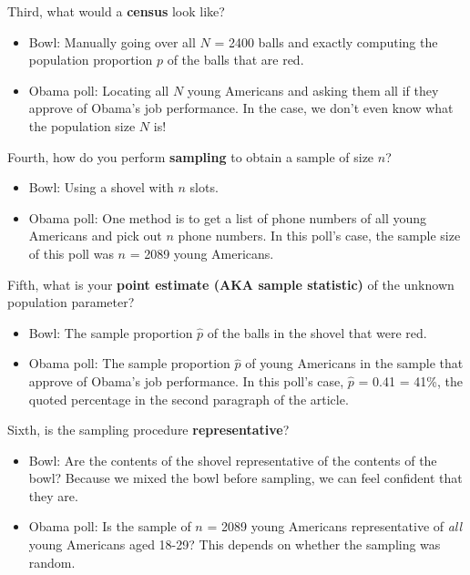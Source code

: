 \documentclass[
]{book}
\providecommand{\tightlist}{%
  \setlength{\itemsep}{0pt}\setlength{\parskip}{0pt}}
\begin{document}
Third, what would a \textbf{census} look like? 

\begin{itemize}
\tightlist
\item
  Bowl: Manually going over all \(N\) = 2400 balls and exactly computing the population proportion \(p\) of the balls that are red.
\item
  Obama poll: Locating all \(N\) young Americans and asking them all if they approve of Obama's job performance. In the case, we don't even know what the population size \(N\) is!
\end{itemize}

Fourth, how do you perform \textbf{sampling} to obtain a sample of size \(n\)? 

\begin{itemize}
\tightlist
\item
  Bowl: Using a shovel with \(n\) slots.
\item
  Obama poll: One method is to get a list of phone numbers of all young Americans and pick out \(n\) phone numbers. In this poll's case, the sample size of this poll was \(n\) = 2089 young Americans.
\end{itemize}

Fifth, what is your \textbf{point estimate (AKA sample statistic)} of the unknown population parameter?

\begin{itemize}
\tightlist
\item
  Bowl: The sample proportion \(\widehat{p}\) of the balls in the shovel that were red.
\item
  Obama poll: The sample proportion \(\widehat{p}\) of young Americans in the sample that approve of Obama's job performance. In this poll's case, \(\widehat{p}\) = 0.41 = 41\%, the quoted percentage in the second paragraph of the article.  
\end{itemize}

Sixth, is the sampling procedure \textbf{representative}? 

\begin{itemize}
\tightlist
\item
  Bowl: Are the contents of the shovel representative of the contents of the bowl? Because we mixed the bowl before sampling, we can feel confident that they are.
\item
  Obama poll: Is the sample of \(n\) = 2089 young Americans representative of \emph{all} young Americans aged 18-29? This depends on whether the sampling was random.
\end{itemize}
\end{document}
